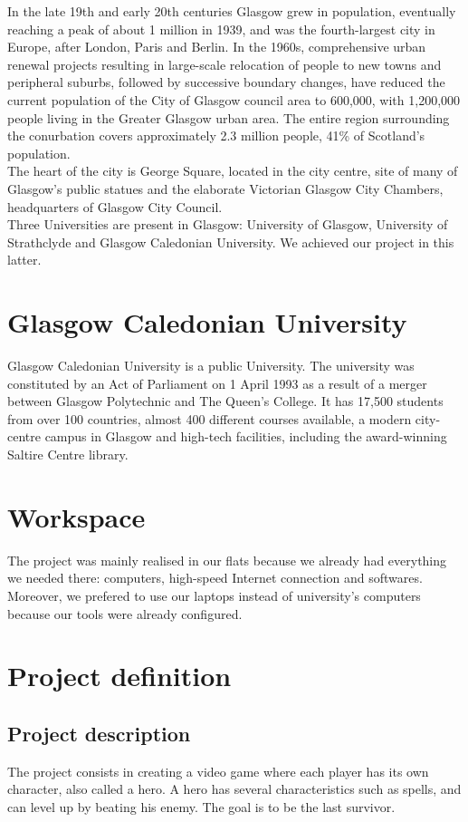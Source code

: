 \documentclass{scrreprt}
\begin{document}
In the late 19th and early 20th centuries Glasgow grew in population, eventually
reaching a peak of about 1 million in 1939, and was the fourth-largest city in Europe, after
London, Paris and Berlin. In the 1960s, comprehensive urban renewal projects resulting in
large-scale relocation of people to new towns and peripheral suburbs, followed by
successive boundary changes, have reduced the current population of the City of Glasgow
council area to 600,000, with 1,200,000 people living in the Greater Glasgow urban area. The
entire region surrounding the conurbation covers approximately 2.3 million people, 41\% of
Scotland's population.\\

The heart of the city is George Square, located in the city centre, site of many of
Glasgow's public statues and the elaborate Victorian Glasgow City Chambers, headquarters
of Glasgow City Council.\\

Three Universities are present in Glasgow: University of Glasgow, University of
Strathclyde and Glasgow Caledonian University. We achieved our project in this latter.

\section{Glasgow Caledonian University}%
Glasgow Caledonian University is a public University. The university was constituted
by an Act of Parliament on 1 April 1993 as a result of a merger between Glasgow Polytechnic
and The Queen's College. It has 17,500 students from over 100 countries, almost 400
different courses available, a modern city-centre campus in Glasgow and high-tech facilities,
including the award-winning Saltire Centre library.

\section{Workspace}
The project was mainly realised in our flats because we already had everything we needed there:
computers, high-speed Internet connection and softwares. Moreover, we prefered to use our laptops
instead of university's computers because our tools were already configured.

\section{Project definition}
\subsection{Project description} %
The project consists in creating a video game where each player has its own character, also 
called a hero. A hero has several characteristics such as %
spells, and can level up by beating his enemy. The goal is to be the last survivor.
\end{document}
